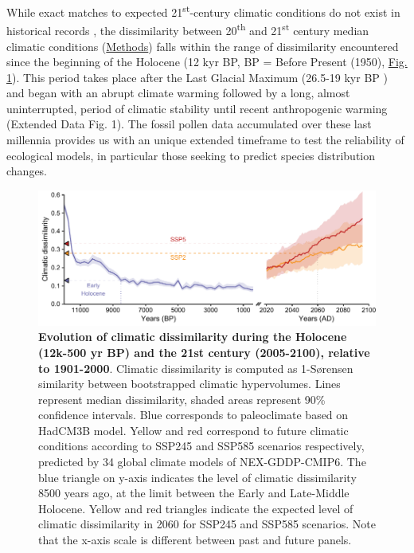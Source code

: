 \documentclass[pdflatex, sn-nature]{sn-jnl}%
\begin{document}
While exact matches to expected 21\textsuperscript{st}-century climatic conditions do not exist in historical records \cite{Burke2018}, the dissimilarity between 20\textsuperscript{th} and 21\textsuperscript{st} century median climatic conditions (\hyperref[methods]{Methods}) falls within the range of dissimilarity encountered since the beginning of the Holocene (12 kyr BP, BP = Before Present (1950), \hyperref[climatic_dissimilarity]{Fig. 1}). This period takes place after the Last Glacial Maximum (26.5-19 kyr BP \cite{Clark2009}) and began with an abrupt climate warming followed by a long, almost uninterrupted, period of climatic stability until recent anthropogenic warming (Extended Data Fig. 1). The fossil pollen data accumulated over these last millennia provides us with an unique extended timeframe to test the reliability of ecological models, in particular those seeking to predict species distribution changes. %

\begin{figure}[ht]
\centering
\hspace*{-0.6in}
\includegraphics[scale=1]{climatic_dissimilarity.pdf}
\begin{adjustwidth}{-0.5cm}{-0.5cm}
\caption{\textbf{Evolution of climatic dissimilarity during the Holocene (12k-500 yr BP) and the 21st century (2005-2100), relative to 1901-2000}. Climatic dissimilarity is computed as 1-Sørensen similarity between bootstrapped climatic hypervolumes. Lines represent median dissimilarity, shaded areas represent 90\% confidence intervals. Blue corresponds to paleoclimate based on HadCM3B model. Yellow and red correspond to future climatic conditions according to SSP245 and SSP585 scenarios respectively, predicted by 34 global climate models of NEX-GDDP-CMIP6. The blue triangle on y-axis indicates the level of climatic dissimilarity 8500 years ago, at the limit between the Early and Late-Middle Holocene. Yellow and red triangles indicate the expected level of climatic dissimilarity in 2060 for SSP245 and SSP585 scenarios. Note that the x-axis scale is different between past and future panels.}\label{climatic_dissimilarity}
\end{adjustwidth}
\end{figure} %
\end{document}
